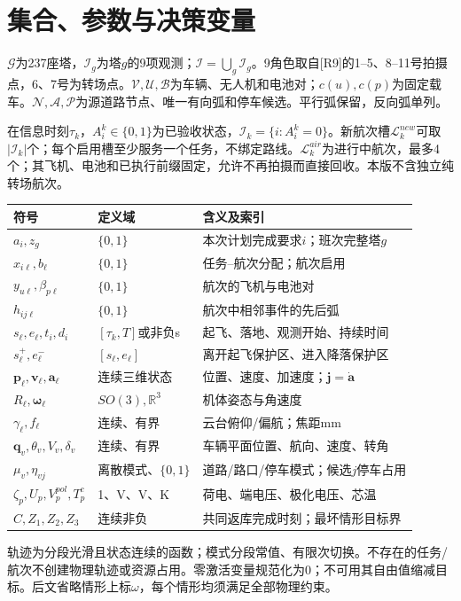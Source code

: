 \section{集合、参数与决策变量}
\noindent $\mathcal G$为237座塔，$\mathcal I_g$为塔$g$的9项观测；$\mathcal I=\bigcup_g\mathcal I_g$。9角色取自[R9]的1--5、8--11号拍摄点，6、7号为转场点。$\mathcal V,\mathcal U,\mathcal B$为车辆、无人机和电池对；$c(u),c(p)$为固定载车。$\mathcal N,\mathcal A,\mathcal P$为源道路节点、唯一有向弧和停车候选。平行弧保留，反向弧单列。

\noindent 在信息时刻$\tau_k$，$A_i^k\in\{0,1\}$为已验收状态，$\mathcal I_k=\{i:A_i^k=0\}$。新航次槽$\mathcal L_k^{new}$可取$|\mathcal I_k|$个；每个启用槽至少服务一个任务，不绑定路线。$\mathcal L_k^{air}$为进行中航次，最多4个；其飞机、电池和已执行前缀固定，允许不再拍摄而直接回收。本版不含独立纯转场航次。
\begin{center}\small
\begin{tabular}{p{.24\linewidth}p{.25\linewidth}p{.41\linewidth}}\toprule
符号 & 定义域 & 含义及索引\\\midrule
$a_i,z_g$ & $\{0,1\}$ & 本次计划完成要求$i$；班次完整塔$g$\\
$x_{i\ell},b_\ell$ & $\{0,1\}$ & 任务--航次分配；航次启用\\
$y_{u\ell},\beta_{p\ell}$ & $\{0,1\}$ & 航次的飞机与电池对\\
$h_{ij\ell}$ & $\{0,1\}$ & 航次中相邻事件的先后弧\\
$s_\ell,e_\ell,t_i,d_i$ & $[\tau_k,T]$或非负s & 起飞、落地、观测开始、持续时间\\
$s_\ell^+,e_\ell^-$ & $[s_\ell,e_\ell]$ & 离开起飞保护区、进入降落保护区\\
$\mathbf p_\ell,\mathbf v_\ell,\mathbf a_\ell$ & 连续三维状态 & 位置、速度、加速度；$\mathbf j=\dot{\mathbf a}$\\
$R_\ell,\boldsymbol\omega_\ell$ & $SO(3),\mathbb R^3$ & 机体姿态与角速度\\
$\gamma_\ell,f_\ell$ & 连续、有界 & 云台俯仰/偏航；焦距mm\\
$\mathbf q_v,\theta_v,V_v,\delta_v$ & 连续、有界 & 车辆平面位置、航向、速度、转角\\
$\mu_v,\eta_{vj}$ & 离散模式、$\{0,1\}$ & 道路/路口/停车模式；候选$j$停车占用\\
$\zeta_p,U_p,V_p^{pol},T_p^c$ & 1、V、V、K & 荷电、端电压、极化电压、芯温\\
$C,Z_1,Z_2,Z_3$ & 连续非负 & 共同返库完成时刻；最坏情形目标界\\\bottomrule
\end{tabular}\end{center}
\noindent 轨迹为分段光滑且状态连续的函数；模式分段常值、有限次切换。不存在的任务/航次不创建物理轨迹或资源占用。零激活变量规范化为0；不可用其自由值缩减目标。后文省略情形上标$\omega$，每个情形均须满足全部物理约束。
\clearpage

